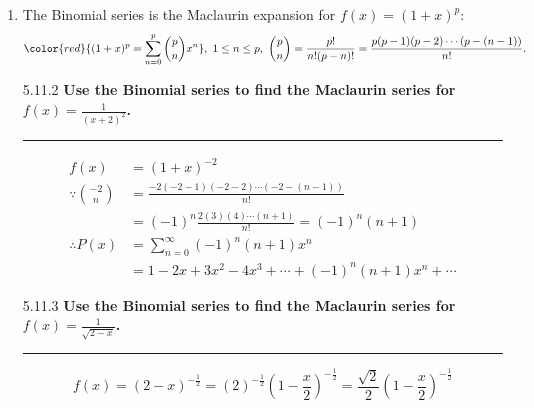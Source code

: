 \documentclass[12pt, a4paper]{article}
\begin{document}
\begin{enumerate}
\begin{example}{5.11.1}{}
\begin{center}
\begin{tabular}{c|c}
            $f'(x)=-(2+x)^{-2}$&$f'(0)=-2(2)^{-2}=-\frac{1}{4}$\\
            $f''(x)=2(2+x)^{-3}$&$f''(0)=2(2)^{-3}=2\times\frac{1}{8}$\\
            $f'''(x)=-6(2+x)^{-4}$&$f'''(0)=-6(2)^{-4}=-6\times\frac{1}{16}$\\
            $f^{(4)}(x)=24(2+x)^{-5}$&$f^{(4)}(0)=24(2)^{-5}=24\times\frac{1}{32}$
        \end{tabular}\end{center}
        $$\begin{aligned}
            P(x)&=\frac{1}{2}+\frac{-\frac{1}{4}}{1!}x+\frac{2\times\frac{1}{8}}{2!}x^2+\frac{-6\times\frac{1}{16}}{3!}x^3+\frac{24(2)^{-5}=24\times\frac{1}{32}}{4!}x^4+\cdots\\
            &=\sum_{n=0}^\infty\left(\frac{1}{2}\right)^{n+1}(-x)^n.
        \end{aligned}$$
    \end{example}
    \item The Binomial series is the Maclaurin expansion for $f(x)=(1+x)^p$: 
    $${\color{red}{(1+x)^p=\sum_{n=0}^p\binom{p}{n}x^n}},\ 1\leq n\leq p,\ \binom{p}{n}=\frac{p!}{n!(p-n)!}=\frac{p(p-1)(p-2)\cdots(p-(n-1))}{n!}.$$
    \begin{example}{5.11.2}{}
        \textbf{Use the Binomial series to find the Maclaurin series for $f(x)=\frac{1}{(x+2)^2}$.}\\
        \noindent\rule[0.1pt]{\textwidth}{1pt}
        $$\begin{aligned}
            f(x)&=(1+x)^{-2}\\
            \because \binom{-2}{n}&=\frac{-2(-2-1)(-2-2)\cdots(-2-(n-1))}{n!}\\
            &=(-1)^n\frac{2(3)(4)\cdots(n+1)}{n!}=(-1)^n(n+1)\\
            \therefore P(x)&=\sum_{n=0}^\infty(-1)^n(n+1)x^n\\
            &=1-2x+3x^2-4x^3+\cdots+(-1)^n(n+1)x^n+\cdots
        \end{aligned}$$
    \end{example}
    \begin{example}{5.11.3}{}
        \textbf{Use the Binomial series to find the Maclaurin series for $f(x)=\frac{1}{\sqrt{2-x}}$.}\\
        \noindent\rule[0.1pt]{\textwidth}{1pt}
            $$f(x)=(2-x)^{-\frac{1}{2}}=(2)^{-\frac{1}{2}}\left(1-\frac{x}{2}\right)^{-\frac{1}{2}}=\frac{\sqrt{2}}{2}\left(1-\frac{x}{2}\right)^{-\frac{1}{2}}$$

\end{example}
\end{enumerate}
\end{document}
